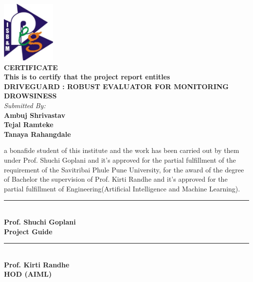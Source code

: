 \documentclass[12pt]{article}
\begin{document}
\begin{titlepage}
\begin{center}

\vspace{0.5cm}
\includegraphics[width=0.2\textwidth]{logo}\\
 \vspace{0.5cm}
\textbf{CERTIFICATE}\\
 \vspace{0.5cm}
\textbf{This is to certify that the project report entitles }\\
\textbf{DRIVEGUARD : ROBUST EVALUATOR FOR MONITORING DROWSINESS}\\
\textit{Submitted By:}\\
\vspace{0.2cm}
\normalsize
\textbf{Ambuj Shrivastav       }\\
\textbf{Tejal Ramteke          }\\
\textbf{Tanaya Rahangdale      }\\
\vspace{0.2cm}
\end{center}


  a bonafide student of this institute and the work has been carried out by them under Prof. Shuchi Goplani and it’s approved for the partial fulfillment of the requirement of the Savitribai
Phule Pune University, for the award of the degree of Bachelor the supervision of Prof. Kirti
Randhe and it’s approved for the partial fulfillment of Engineering(Artificial Intelligence and
Machine Learning).

\vspace{1.5 cm}
\begin{minipage}[t]{0.3\textwidth}
    \centering
    \rule{4.4 cm}{1pt}\\
\textbf {Prof. Shuchi Goplani}\\
    \textbf {Project Guide}
\end{minipage}
\hfill
\begin{minipage}[t]{0.3\textwidth}

    \centering
    \rule{4.2cm}{1pt}\\

\textbf {Prof. Kirti Randhe}\\
\textbf {HOD (AIML)}
\end{minipage}


\end{titlepage}
\end{document}
